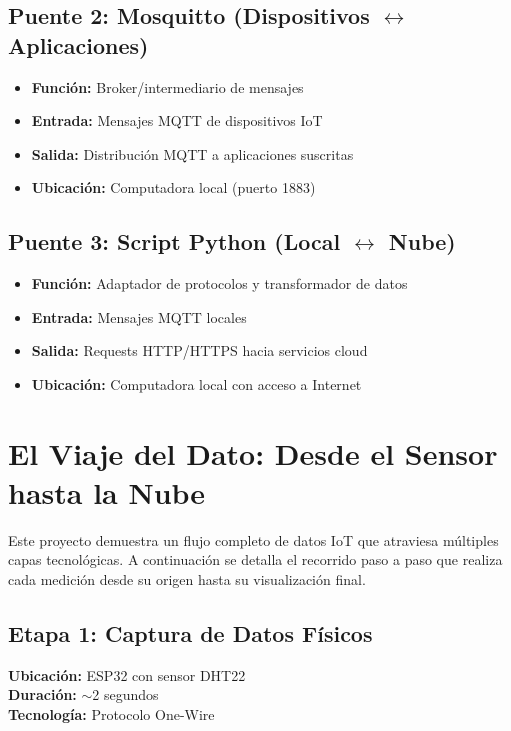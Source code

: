 \documentclass[12pt]{article}
\begin{document}
\subsection{Puente 2: Mosquitto (Dispositivos $\leftrightarrow$ Aplicaciones)}
\begin{itemize}
    \item \textbf{Función:} Broker/intermediario de mensajes
    \item \textbf{Entrada:} Mensajes MQTT de dispositivos IoT
    \item \textbf{Salida:} Distribución MQTT a aplicaciones suscritas
    \item \textbf{Ubicación:} Computadora local (puerto 1883)
\end{itemize}

\subsection{Puente 3: Script Python (Local $\leftrightarrow$ Nube)}
\begin{itemize}
    \item \textbf{Función:} Adaptador de protocolos y transformador de datos
    \item \textbf{Entrada:} Mensajes MQTT locales
    \item \textbf{Salida:} Requests HTTP/HTTPS hacia servicios cloud
    \item \textbf{Ubicación:} Computadora local con acceso a Internet
\end{itemize}

\section{El Viaje del Dato: Desde el Sensor hasta la Nube}

Este proyecto demuestra un flujo completo de datos IoT que atraviesa múltiples capas tecnológicas. A continuación se detalla el recorrido paso a paso que realiza cada medición desde su origen hasta su visualización final.

\subsection{Etapa 1: Captura de Datos Físicos}
\textbf{Ubicación:} ESP32 con sensor DHT22\\
\textbf{Duración:} $\sim$2 segundos\\
\textbf{Tecnología:} Protocolo One-Wire
\end{document}
